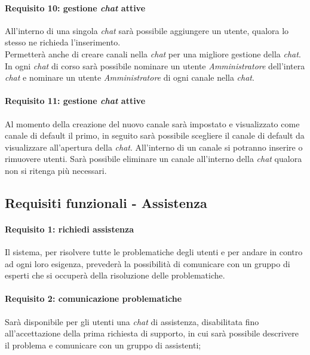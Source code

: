 \begin{enumerate}
\paragraph{Requisito 10: gestione \emph{chat} attive\\}
All’interno di una singola \emph{chat} sarà possibile aggiungere un utente, qualora lo stesso ne richieda l’inserimento.\\
Permetterà anche di creare canali nella \emph{chat} per una migliore gestione della \emph{chat}. 
In ogni \emph{chat} di corso sarà possibile nominare un utente \emph{Amministratore} dell’intera \emph{chat} e nominare un utente \emph{Amministratore} di ogni canale nella \emph{chat}.

\paragraph{Requisito 11: gestione \emph{chat} attive\\}
Al momento della creazione del nuovo canale sarà impostato e visualizzato come canale di default il primo, in seguito sarà possibile scegliere il canale di default da visualizzare all’apertura della \emph{chat}. All’interno di un canale si potranno inserire o rimuovere utenti. Sarà possibile eliminare un canale all’interno della \emph{chat} qualora non si ritenga più necessari.

\subsection{Requisiti funzionali - Assistenza}
\paragraph{Requisito 1: richiedi assistenza\\}
Il sistema, per risolvere tutte le problematiche degli utenti e per andare in contro ad ogni loro esigenza, prevederà la possibilità di comunicare con un gruppo di esperti che si occuperà della risoluzione delle problematiche.

\paragraph{Requisito 2: comunicazione problematiche\\}
Sarà disponibile per gli utenti una \emph{chat} di assistenza, disabilitata fino all’accettazione della prima richiesta di supporto, in cui sarà possibile descrivere il problema e comunicare con un gruppo di assistenti;


\end{enumerate}
